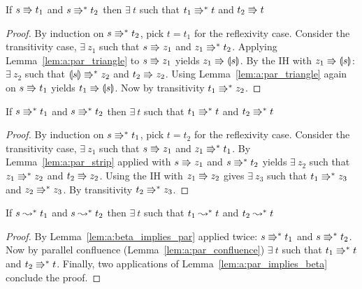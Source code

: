 \begin{lemma}
    If $s \Rrightarrow t_1$ and $s \Rrightarrow^* t_2$ then $\exists\ t$ such that $t_1 \Rrightarrow^* t$ and $t_2 \Rrightarrow t$
    \label{lem:a:par_strip}
\end{lemma}
\begin{proof}
    By induction on $s \Rrightarrow^* t_2$, pick $t = t_1$ for the reflexivity case.
    Consider the transitivity case, $\exists\ z_1$ such that $s \Rrightarrow z_1$ and $z_1 \Rrightarrow^* t_2$.
    Applying Lemma~\ref{lem:a:par_triangle} to $s \Rrightarrow z_1$ yields $z_1 \Rrightarrow \llparenthesis {s} \rrparenthesis$.
    By the IH with $z_1 \Rrightarrow \llparenthesis {s} \rrparenthesis$: $\exists\ z_2$ such that $\llparenthesis {s} \rrparenthesis \Rrightarrow^* z_2$ and $t_2 \Rrightarrow z_2$.
    Using Lemma~\ref{lem:a:par_triangle} again on $s \Rrightarrow t_1$ yields $t_1 \Rrightarrow \llparenthesis {s} \rrparenthesis$.
    Now by transitivity $t_1 \Rrightarrow^* z_2$.
\end{proof}

\begin{lemma}
    If $s \Rrightarrow^* t_1$ and $s \Rrightarrow^* t_2$ then $\exists\ t$ such that $t_1 \Rrightarrow^* t$ and $t_2 \Rrightarrow^* t$
    \label{lem:a:par_confluence}
\end{lemma}
\begin{proof}
    By induction on $s \Rrightarrow^* t_1$, pick $t = t_2$ for the reflexivity case.
    Consider the transitivity case, $\exists\ z_1$ such that $s \Rrightarrow z_1$ and $z_1 \Rrightarrow^* t_1$.
    By Lemma~\ref{lem:a:par_strip} applied with $s \Rrightarrow z_1$ and $s \Rrightarrow^* t_2$ yields $\exists\ z_2$ such that $z_1 \Rrightarrow^* z_2$ and $t_2 \Rrightarrow z_2$.
    Using the IH with $z_1 \Rrightarrow z_2$ gives $\exists\ z_3$ such that $t_1 \Rrightarrow^* z_3$ and $z_2 \Rrightarrow^* z_3$.
    By transitivity $t_2 \Rrightarrow^* z_3$.
\end{proof}

\begin{lemma}[Confluence]
    If $s \leadsto^* t_1$ and $s \leadsto^* t_2$ then $\exists\ t$ such that $t_1 \leadsto^* t$ and $t_2 \leadsto^* t$
\end{lemma}
\begin{proof}
    By Lemma~\ref{lem:a:beta_implies_par} applied twice: $s \Rrightarrow^* t_1$ and $s \Rrightarrow^* t_2$.
    Now by parallel confluence (Lemma~\ref{lem:a:par_confluence}) $\exists\ t$ such that $t_1 \Rrightarrow^* t$ and $t_2 \Rrightarrow^* t$.
    Finally, two applications of Lemma~\ref{lem:a:par_implies_beta} conclude the proof.
\end{proof}
